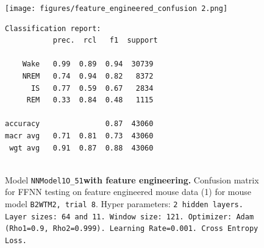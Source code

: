 \documentclass{article}
\begin{document}
\begin{figure}[H]
    \centering
    \begin{tcolorbox}[colframe=black, colback=white, sharp corners, boxrule=0.2mm, width=\textwidth]
        \begin{minipage}[t]{0.48\textwidth}
            \centering
            \texttt{[image: figures/feature\_engineered\_confusion 2.png]}
            \caption{Model \texttt{NNModel1O\_51}\textbf{with feature engineering. }Confusion matrix for FFNN testing on feature engineered mouse data (1) for mouse model \texttt{B2WTM2, trial 8}. Hyper parameters: \texttt{2 hidden layers. Layer sizes: 64 and 11. Window size: 121. Optimizer: Adam (Rho1=0.9, Rho2=0.999). Learning Rate=0.001. Cross Entropy Loss.}}
            \label{fig:ffnn_fe_cm1}
            \vspace{0.5cm}
            {\small
            \begin{verbatim}
Classification report:
           prec.  rcl   f1  support

    Wake   0.99  0.89  0.94  30739
    NREM   0.74  0.94  0.82   8372
      IS   0.77  0.59  0.67   2834
     REM   0.33  0.84  0.48   1115

accuracy               0.87  43060
macr avg   0.71  0.81  0.73  43060
 wgt avg   0.91  0.87  0.88  43060


\end{verbatim}}
\end{minipage}
\end{tcolorbox}
\end{figure}
\end{document}
